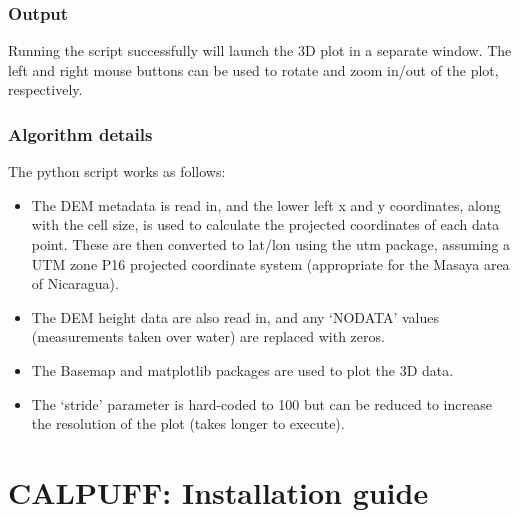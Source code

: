 \documentclass[10pt,a4paper]{article}
\begin{document}
\subsubsection{Output}
Running the script successfully will launch the 3D plot in a separate window. The left and right mouse buttons can be used to rotate and zoom in/out of the plot, respectively.

\subsubsection{Algorithm details}
The python script works as follows:
\begin{itemize}
\item The DEM metadata is read in, and the lower left x and y coordinates, along with the cell size, is used to calculate the projected coordinates of each data point. These are then converted to lat/lon using the utm package, assuming a UTM zone P16 projected coordinate system (appropriate for the Masaya area of Nicaragua).
\item The DEM height data are also read in, and any `NODATA' values (measurements taken over water) are replaced with zeros.
\item The Basemap and matplotlib packages are used to plot the 3D data.
\item The `stride' parameter is hard-coded to 100 but can be reduced to increase the resolution of the plot (takes longer to execute).
\end{itemize}

\section{CALPUFF: Installation guide} \label{Installation}
\end{document}
